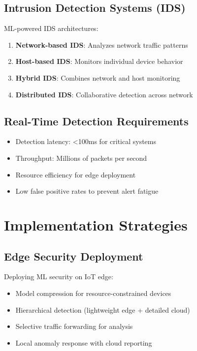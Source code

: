 \documentclass[12pt,a4paper]{article}
\begin{document}
\subsection{Intrusion Detection Systems (IDS)}

ML-powered IDS architectures:
\begin{enumerate}
    \item \textbf{Network-based IDS}: Analyzes network traffic patterns
    \item \textbf{Host-based IDS}: Monitors individual device behavior
    \item \textbf{Hybrid IDS}: Combines network and host monitoring
    \item \textbf{Distributed IDS}: Collaborative detection across network
\end{enumerate}

\subsection{Real-Time Detection Requirements}

\begin{tcolorbox}[colback=securityred!10, colframe=securityred, title=Real-Time Constraints]
\begin{itemize}
    \item Detection latency: <100ms for critical systems
    \item Throughput: Millions of packets per second
    \item Resource efficiency for edge deployment
    \item Low false positive rates to prevent alert fatigue
\end{itemize}
\end{tcolorbox}

\section{Implementation Strategies}

\subsection{Edge Security Deployment}

Deploying ML security on IoT edge:
\begin{itemize}
    \item Model compression for resource-constrained devices
    \item Hierarchical detection (lightweight edge + detailed cloud)
    \item Selective traffic forwarding for analysis
    \item Local anomaly response with cloud reporting
\end{itemize}
\end{document}
